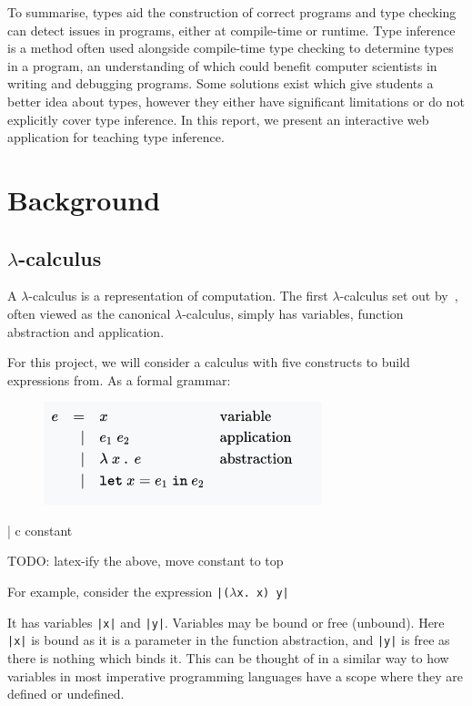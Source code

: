 \documentclass[a4paper,fleqn,twoside,12pt]{report}
\begin{document}
To summarise, types aid the construction of correct programs and type checking can detect issues in programs, either at compile-time or runtime. Type inference is a method often used alongside compile-time type checking to determine types in a program, an understanding of which could benefit computer scientists in writing and debugging programs. Some solutions exist which give students a better idea about types, however they either have significant limitations or do not explicitly cover type inference. In this report, we present an interactive web application for teaching type inference.
\chapter{Background}\label{id:h.ebjyqi73zdyo}
\section{$\lambda$-calculus}\label{id:h.odw4vku9eizz}
A $\lambda$-calculus is a representation of computation. The first $\lambda$-calculus set out by~\cite{ref10}, often viewed as the canonical $\lambda$-calculus, simply has variables, function abstraction and application.

For this project, we will consider a calculus with five constructs to build expressions from. As a formal grammar:

\begin{figure}[h!]
  \centering
  \includegraphics[width=0.510\linewidth]{images/image28.png}
\end{figure}
    | c constant

TODO: latex-ify the above, move constant to top

For example, consider the expression \texttt{|($\lambda$x. x) y|}

It has variables \texttt{|x|} and \texttt{|y|}. Variables may be bound or free (unbound). Here \texttt{|x|} is bound as it is a parameter in the function abstraction, and \texttt{|y|} is free as there is nothing which binds it. This can be thought of in a similar way to how variables in most imperative programming languages have a scope where they are defined or undefined.
\end{document}
